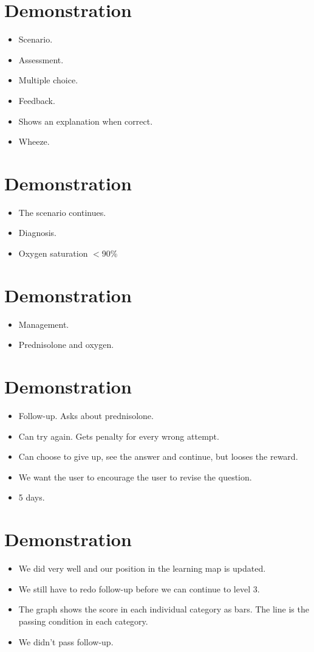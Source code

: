 \documentclass[20pt]{extarticle}
\begin{document}
	\section{Demonstration}
	\begin{itemize}
		\item Scenario.
		\item Assessment.
		\item Multiple choice.
		\item Feedback.
		\item Shows an explanation when correct.
		\item Wheeze.
	\end{itemize}

	\section{Demonstration}
	\begin{itemize}
		\item The scenario continues.
		\item Diagnosis.
		\item Oxygen saturation $<$90\%
	\end{itemize}

	\section{Demonstration}
	\begin{itemize}
		\item Management.
		\item Prednisolone and oxygen.
	\end{itemize}

	\section{Demonstration}
	\begin{itemize}
		\item Follow-up. Asks about prednisolone.
		\item Can try again. Gets penalty for every wrong attempt.
		\item Can choose to give up, see the answer and continue, but looses the reward.
		\item We want the user to encourage the user to revise the question.
		\item 5 days.
	\end{itemize}

	\section{Demonstration}
	\begin{itemize}
		\item We did very well and our position in the learning map is updated.
		\item We still have to redo follow-up before we can continue to level 3.
		\item The graph shows the score in each individual category as bars. The line is the passing condition in each category.
		\item We didn't pass follow-up.
	\end{itemize}
\end{document}
